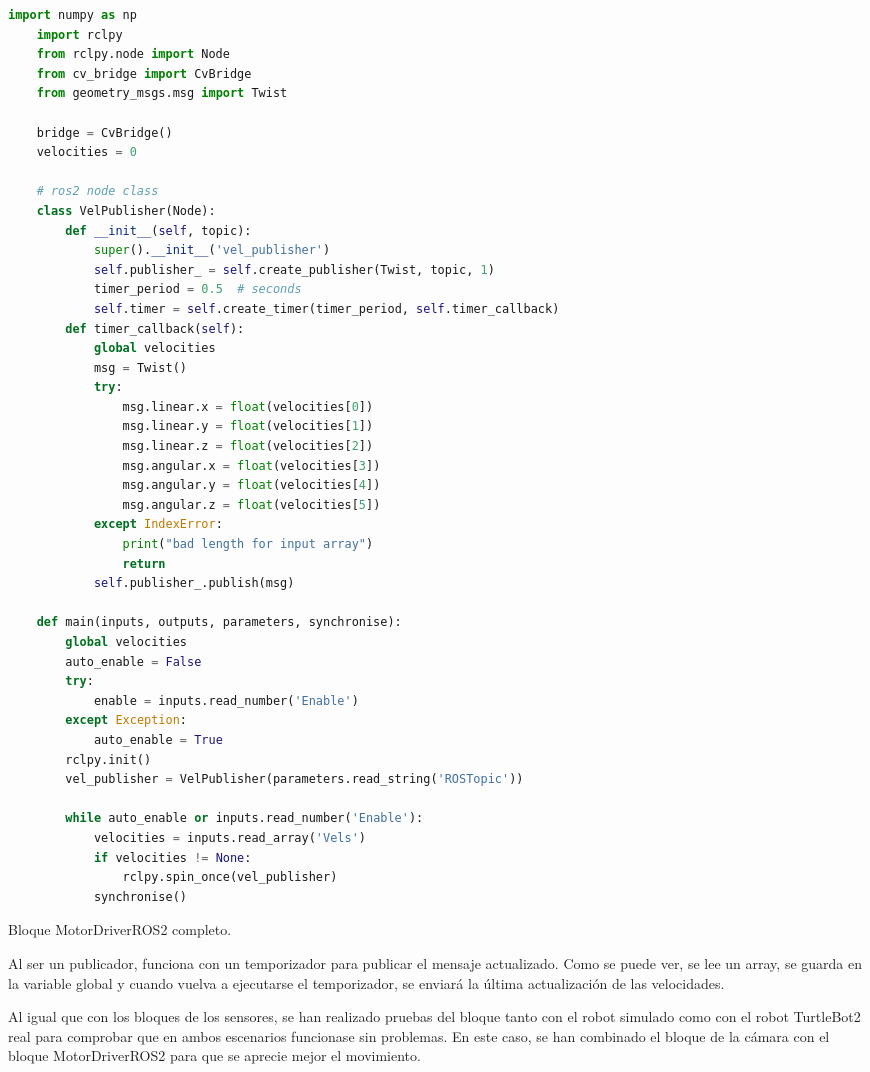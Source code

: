 \begin{code}[H]
  \begin{lstlisting}[language=python]
    import numpy as np
    import rclpy
    from rclpy.node import Node
    from cv_bridge import CvBridge
    from geometry_msgs.msg import Twist

    bridge = CvBridge()
    velocities = 0

    # ros2 node class
    class VelPublisher(Node):
        def __init__(self, topic):
            super().__init__('vel_publisher')
            self.publisher_ = self.create_publisher(Twist, topic, 1)
            timer_period = 0.5  # seconds
            self.timer = self.create_timer(timer_period, self.timer_callback)
        def timer_callback(self):
            global velocities
            msg = Twist()
            try:
                msg.linear.x = float(velocities[0])
                msg.linear.y = float(velocities[1])
                msg.linear.z = float(velocities[2])
                msg.angular.x = float(velocities[3])
                msg.angular.y = float(velocities[4])
                msg.angular.z = float(velocities[5])
            except IndexError:
                print("bad length for input array")
                return
            self.publisher_.publish(msg)

    def main(inputs, outputs, parameters, synchronise):
        global velocities
        auto_enable = False
        try:
            enable = inputs.read_number('Enable')
        except Exception:
            auto_enable = True
        rclpy.init()
        vel_publisher = VelPublisher(parameters.read_string('ROSTopic'))

        while auto_enable or inputs.read_number('Enable'):
            velocities = inputs.read_array('Vels')
            if velocities != None:
                rclpy.spin_once(vel_publisher)
            synchronise()
  \end{lstlisting}
  \caption[Bloque MotorDriverROS2]{Bloque MotorDriverROS2 completo.}
  \label{cod:motordriverros2_all}
\end{code}

\newpage

Al ser un publicador, funciona con un temporizador para publicar el mensaje actualizado. Como se puede ver, se lee un array, se guarda en
la variable global y cuando vuelva a ejecutarse el temporizador, se enviará la última actualización de las velocidades.

Al igual que con los bloques de los sensores, se han realizado pruebas del bloque tanto con el robot simulado como con el robot TurtleBot2 real
para comprobar que en ambos escenarios funcionase sin problemas. En este caso, se han combinado el bloque de la cámara con el bloque MotorDriverROS2
para que se aprecie mejor el movimiento.

